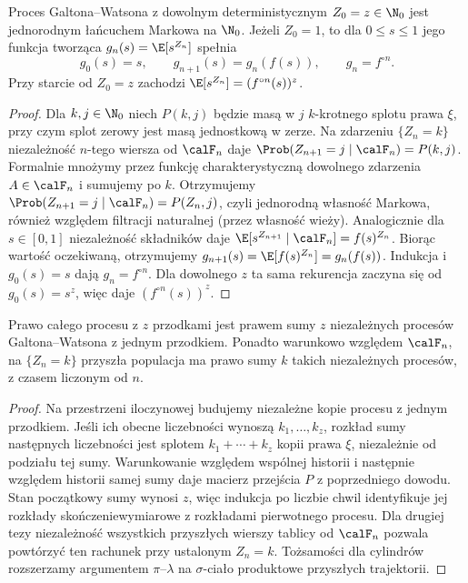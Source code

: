 \begin{twierdzenie}
Proces Galtona--Watsona z dowolnym deterministycznym
$Z_0=z\in\N_0$ jest jednorodnym łańcuchem Markowa
na $\N_0$. Jeżeli $Z_0=1$, to dla
$0\le s\le1$ jego funkcja tworząca $g_n(s)=\E[s^{Z_n}]$
spełnia
\[
g_0(s)=s,\qquad g_{n+1}(s)=g_n(f(s)),
\qquad g_n=f^{\circ n}.
\]
Przy starcie od $Z_0=z$ zachodzi $\E[s^{Z_n}]=(f^{\circ n}(s))^z$.
\end{twierdzenie}
\begin{proof}
Dla $k,j\in\N_0$ niech $P(k,j)$ będzie masą w $j$
$k$-krotnego splotu prawa $\xi$, przy czym splot zerowy
jest masą jednostkową w zerze.
Na zdarzeniu $\{Z_n=k\}$ niezależność $n$-tego wiersza
od $\calF_n$ daje
$\Prob(Z_{n+1}=j\mid\calF_n)=P(k,j)$.
Formalnie mnożymy przez funkcję charakterystyczną
dowolnego zdarzenia $A\in\calF_n$ i sumujemy po $k$.
Otrzymujemy $\Prob(Z_{n+1}=j\mid\calF_n)=P(Z_n,j)$,
czyli jednorodną własność Markowa, również względem
filtracji naturalnej (przez własność wieży).
Analogicznie dla $s\in[0,1]$ niezależność składników
daje $\E[s^{Z_{n+1}}\mid\calF_n]=f(s)^{Z_n}$.
Biorąc wartość oczekiwaną, otrzymujemy
$g_{n+1}(s)=\E[f(s)^{Z_n}]=g_n(f(s))$.
Indukcja i $g_0(s)=s$ dają $g_n=f^{\circ n}$.
Dla dowolnego $z$ ta sama rekurencja zaczyna się
od $g_0(s)=s^z$, więc daje $(f^{\circ n}(s))^z$.
\end{proof}

\begin{stwierdzenie}
\label{prop:gw-branching}
Prawo całego procesu z $z$ przodkami jest prawem sumy
$z$ niezależnych procesów Galtona--Watsona z jednym
przodkiem. Ponadto warunkowo względem $\calF_n$,
na $\{Z_n=k\}$ przyszła populacja ma prawo sumy
$k$ takich niezależnych procesów, z czasem liczonym od $n$.
\end{stwierdzenie}
\begin{proof}
Na przestrzeni iloczynowej budujemy niezależne kopie
procesu z jednym przodkiem. Jeśli ich obecne liczebności
wynoszą $k_1,\ldots,k_z$, rozkład sumy następnych
liczebności jest splotem $k_1+\cdots+k_z$ kopii
prawa $\xi$, niezależnie od podziału tej sumy.
Warunkowanie względem wspólnej historii i następnie
względem historii samej sumy daje macierz przejścia
$P$ z poprzedniego dowodu.
Stan początkowy sumy wynosi $z$, więc indukcja
po liczbie chwil identyfikuje jej rozkłady
skończeniewymiarowe z rozkładami pierwotnego procesu.
Dla drugiej tezy niezależność wszystkich przyszłych
wierszy tablicy od $\calF_n$ pozwala powtórzyć
ten rachunek przy ustalonym $Z_n=k$. Tożsamości dla
cylindrów rozszerzamy argumentem $\pi$--$\lambda$
na $\sigma$-ciało produktowe przyszłych trajektorii.
\end{proof}

